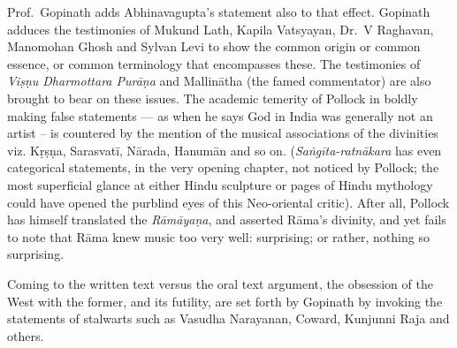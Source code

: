 Prof.\ Gopinath adds Abhinavagupta’s statement also to that effect. Gopinath adduces the testimonies of Mukund Lath, Kapila Vatsyayan, Dr.\ V Raghavan, Manomohan Ghosh and Sylvan Levi to show the common origin or common essence, or common terminology that encompasses these. The testimonies of \textsl{Viṣṇu Dharmottara Purāṇa} and Mallinātha (the famed commentator) are also brought to bear on these issues. The academic temerity of Pollock in boldly making false statements --- as when he says God in India was generally not an artist -- is countered by the mention of the musical associations of the divinities viz. Kṛṣṇa, Sarasvatī, Nārada, Hanumān and so on. (\textsl{Saṅgīta-ratnākara} has even categorical statements, in the very opening chapter, not noticed by Pollock; the most superficial glance at either Hindu sculpture or pages of Hindu mythology could have opened the purblind eyes of this Neo-oriental critic). After all, Pollock has himself translated the \textsl{Rāmāyaṇa}, and asserted Rāma’s divinity, and yet fails to note that Rāma knew music too very well: surprising; or rather, nothing so surprising.

Coming to the written text versus the oral text argument, the obsession of the West with the former, and its futility, are set forth by Gopinath by invoking the statements of stalwarts such as Vasudha Narayanan, Coward, Kunjunni Raja and others.

